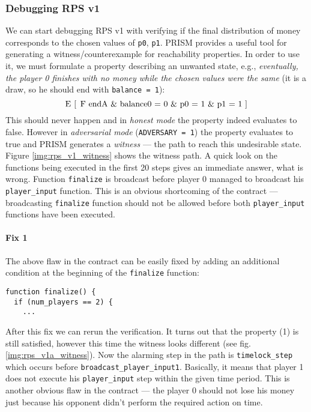 \documentclass{article}
\begin{document}
\subsubsection{Debugging RPS v1}
We can start debugging RPS v1 with verifying if the final distribution of money corresponds to the chosen values 
of \lstinline{p0}, \lstinline{p1}.
PRISM provides a useful tool for generating a witness/counterexample for reachability properties.
In order to use it, we must formulate a property describing an unwanted state, e.g., 
\textit{eventually, the player 0 finishes with no money
while the chosen values were the same} (it is a draw, so he should end with \lstinline{balance = 1}):
\begin{equation}
\text{\lstinline{E [ F endA & balance0 = 0 & p0 = 1 & p1 = 1 ]}}
\label{prop:rps_v1_witness}
\end{equation}
This should never happen and in \emph{honest mode} the property indeed evaluates to false.
However in \emph{adversarial mode} (\lstinline{ADVERSARY = 1}) the property evaluates to true and PRISM
generates a \emph{witness} --- the path to reach this undesirable state.
Figure \ref{img:rps_v1_witness} shows the witness path.
A quick look on the functions being executed in the first 20 steps gives an immediate answer, what is wrong.
Function \lstinline{finalize} is broadcast before player 0 managed to broadcast his \lstinline{player_input} function.
This is an obvious shortcoming of the contract --- broadcasting \lstinline{finalize} function should not be allowed
before both \lstinline{player_input} functions have been executed.

\paragraph{Fix 1} 

The above flaw in the contract can be easily fixed by adding an additional condition at the beginning of the 
\lstinline{finalize} function:
\begin{lstlisting}
function finalize() {
  if (num_players == 2) {
    ...
\end{lstlisting}

After this fix we can rerun the verification.
It turns out that the property (1) is still satisfied, however this
time the witness looks different (see fig. \ref{img:rps_v1a_witness}).
Now the alarming step in the path is \lstinline{timelock_step} which occurs before \lstinline{broadcast_player_input1}.
Basically, it means that player 1 does not execute his \lstinline{player_input} step within the given time period.
This is another obvious flaw in the contract --- the player 0 should not lose his money just because his opponent
didn't perform the required action on time.
\end{document}
